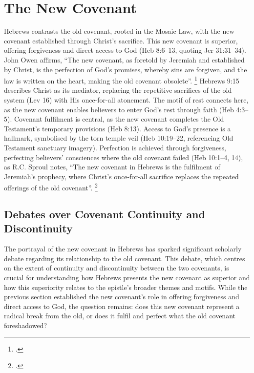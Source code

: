 \documentclass[12pt]{article}
\begin{document}
\section{The New Covenant}
Hebrews contrasts the old covenant, rooted in the Mosaic Law, with the new
covenant established through Christ’s sacrifice. This new covenant is superior,
offering forgiveness and direct access to God (Heb 8:6--13, quoting Jer
31:31--34). John Owen affirms, ``The new covenant, as foretold by Jeremiah and
established by Christ, is the perfection of God’s promises, whereby sins are
forgiven, and the law is written on the heart, making the old covenant
obsolete''. \footcite[4:123]{Owen1854}
Hebrews 9:15 describes Christ as its mediator,
replacing the repetitive sacrifices of the old system (Lev 16) with His
once-for-all atonement. The motif of rest connects here, as the new covenant
enables believers to enter God’s rest through faith (Heb 4:3--5). Covenant
fulfilment is central, as the new covenant completes the Old Testament’s
temporary provisions (Heb 8:13). Access to God’s presence is a hallmark,
symbolised by the torn temple veil (Heb 10:19--22, referencing Old Testament
sanctuary imagery). Perfection is achieved through forgiveness, perfecting
believers’ consciences where the old covenant failed (Heb 10:1--4, 14), as R.C.
Sproul notes, ``The new covenant in Hebrews is the fulfilment of Jeremiah’s
prophecy, where Christ’s once-for-all sacrifice replaces the repeated offerings
of the old covenant''. \footcite[45]{Sproul1985}

\subsection{Debates over Covenant Continuity and Discontinuity}
The portrayal of the new covenant in Hebrews has sparked significant scholarly
debate regarding its relationship to the old covenant. This debate, which
centres on the extent of continuity and discontinuity between the two covenants,
is crucial for understanding how Hebrews presents the new covenant as superior
and how this superiority relates to the epistle’s broader themes and motifs.
While the previous section established the new covenant’s role in offering
forgiveness and direct access to God, the question remains: does this new
covenant represent a radical break from the old, or does it fulfil and perfect
what the old covenant foreshadowed?
\end{document}
